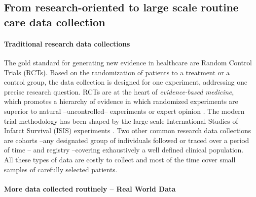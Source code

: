 \documentclass[french,12pt,twoside,a4paper]{book}
\begin{document}
\begin{background_box_left}

  \subsection{From research-oriented to large scale routine care data collection}%
  \label{subsec:intro:data_collections}

  \paragraph{Traditional research data collections}
  The gold standard for generating new evidence in healthcare are Random Control
  Trials (RCTs). Based on the randomization of patients to a treatment or a
  control group, the data collection is designed for one experiment, addressing
  one precise research question. RCTs are at the heart of \emph{evidence-based
    medicine}, which promotes a hierarchy of evidence in which randomized
  experiments are superior to natural --uncontrolled-- experiments or expert
  opinion \citep{guyatt1995users}. The modern trial methodology has been shaped
  by the large-scale International Studies of Infarct Survival (ISIS)
  experiments \citep{isis1_randomised_1986}. Two other common research data
  collections are cohorts --any designated group of individuals followed or
  traced over a period of time \citep{porta2014dictionary}-- and registry
  --covering exhaustively a well defined clinical population. All these types of
  data are costly to collect and most of the time cover small samples of
  carefully selected patients.




  \paragraph{More data collected routinely -- Real World Data}%
  \label{subsec:intro:real_world_data}


\end{background_box_left}
\end{document}

